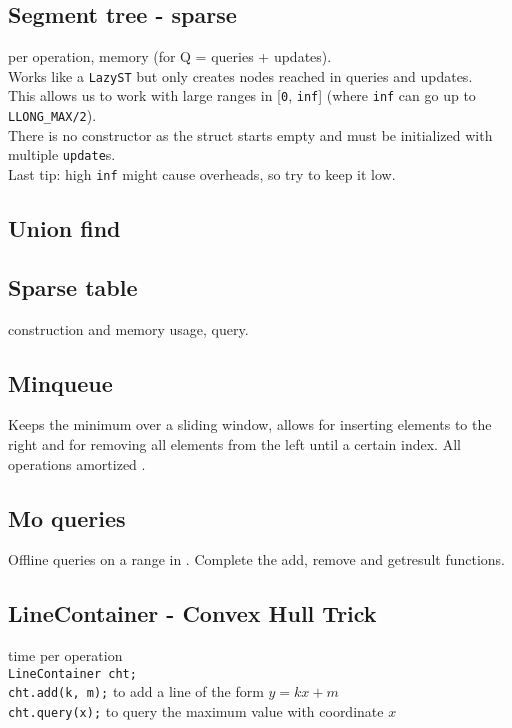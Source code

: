 \subsection{Segment tree - sparse}
 per operation,  memory (for Q = queries + updates).\\
Works like a \verb|LazyST| but only creates nodes reached in queries and updates.\\
This allows us to work with large ranges in [\verb|0|, \verb|inf|] (where \verb|inf| can go up to \verb|LLONG_MAX/2|).\\
There is no constructor as the struct starts empty and must be initialized with multiple \verb|update|s.\\
Last tip: high \verb|inf| might cause overheads, so try to keep it low.

\subsection{Union find}

\subsection{Sparse table}
 construction and memory usage,  query.

\subsection{Minqueue}
Keeps the minimum over a sliding window, allows for inserting elements to the right and for removing all elements from the left until a certain index. All operations amortized .

\subsection{Mo queries}
Offline queries on a range in . Complete the add, remove and getresult functions.

\subsection{LineContainer - Convex Hull Trick}

 time per operation \\
\verb|LineContainer cht;| \\
\verb|cht.add(k, m);| to add a line of the form $y = kx + m$ \\
\verb|cht.query(x);| to query the maximum value with coordinate $x$


